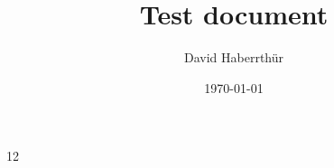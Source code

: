 \documentclass{article}
\title{Test document}
\author{David Haberrthür}
\date{\today}
\begin{document}
\maketitle

12
\end{document}
